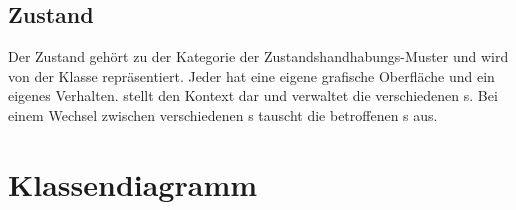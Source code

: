 \subsection{Zustand}
Der Zustand gehört zu der Kategorie der Zustandshandhabungs-Muster und wird von der Klasse  repräsentiert. Jeder  hat eine eigene grafische Oberfläche und ein eigenes Verhalten.
 stellt den Kontext dar und verwaltet die verschiedenen s. Bei einem Wechsel zwischen verschiedenen s tauscht  die betroffenen s aus.

\section{Klassendiagramm}
